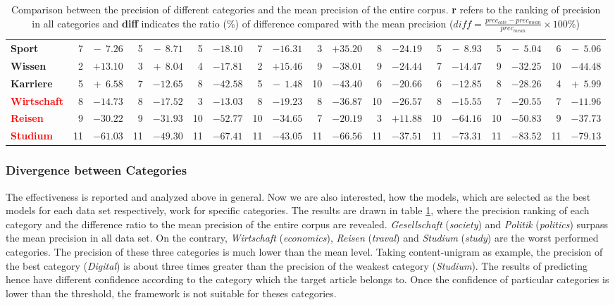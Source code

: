 \begin{table}[!htb]
{\begin{tabular}{lrr|rr|rr|rr|rr|rr|rr|rr|rr}
\textbf{Sport} & 7 & $-~~7.26$ & 5 & $-~~8.71$ & 5 & $-18.10$ & 7 & $-16.31$ & 3 & $+35.20$ & 8 & $-24.19$ & 5 & $-~~8.93$ & 5 & $-~~5.04$ & 6 & $-~~5.06$ \\
\textbf{Wissen} & 2 & $+13.10$ & 3 & $+~~8.04$ & 4 & $-17.81$ & 2 & $+15.46$ & 9 & $-38.01$ & 9 & $-24.44$ & 7 & $-14.47$ & 9 & $-32.25$ & 10 & $-44.48$ \\
\textbf{Karriere} & 5 & $+~~6.58$ & 7 & $-12.65$ & 8 & $-42.58$ & 5 & $-~~1.48$ & 10 & $-43.40$ & 6 & $-20.66$ & 6 & $-12.85$ & 8 & $-28.26$ & 4 & $+~~5.99$ \\
\textbf{\textcolor{red}{Wirtschaft}} & 8 & $-14.73$ & 8 & $-17.52$ & 3 & $-13.03$ & 8 & $-19.23$ & 8 & $-36.87$ & 10 & $-26.57$ & 8 & $-15.55$ & 7 & $-20.55$ & 7 & $-11.96$ \\
\textbf{\textcolor{red}{Reisen}} & 9 & $-30.22$ & 9 & $-31.93$ & 10 & $-52.77$ & 10 & $-34.65$ & 7 & $-20.19$ & 3 & $+11.88$ & 10 & $-64.16$ & 10 & $-50.83$ & 9 & $-37.73$ \\
\textbf{\textcolor{red}{Studium}} & 11 & $-61.03$ & 11 & $-49.30$ & 11 & $-67.41$ & 11 & $-43.05$ & 11 & $-66.56$ & 11 & $-37.51$ & 11 & $-73.31$ & 11 & $-83.52$ & 11 & $-79.13$ \\ \hline
\end{tabular}%
}
\caption{Comparison between the precision of different categories and the mean precision of the entire corpus. \textbf{r} refers to the ranking of precision in all categories and \textbf{diff} indicates the ratio (\%) of difference compared with the mean precision ($diff = \frac{prec_{cate} - prec_{mean}}{prec_{mean}}\times 100\%$)}
\label{tab:cate_precision}
\end{table}

\subsubsection{Divergence between Categories}

The effectiveness is reported and analyzed above in general. Now we are also interested, how the models, which are selected as the best models for each data set respectively, work for specific categories. The results are drawn in table \ref{tab:cate_precision}, where the precision ranking of each category and the difference ratio to the mean precision of the entire corpus are revealed. \textit{Gesellschaft} (\textit{society}) and \textit{Politik} (\textit{politics}) surpass the mean precision in all data set. On the contrary, \textit{Wirtschaft} (\textit{economics}), \textit{Reisen} (\textit{traval}) and \textit{Studium} (\textit{study}) are the worst performed categories. The precision of these three categories is much lower than the mean level. Taking content-unigram as example, the precision of the best category (\textit{Digital}) is about three times greater than the precision of the weakest category (\textit{Studium}). The results of predicting hence have  different confidence according to the category which the target article belongs to. Once the confidence of particular categories is lower than the threshold, the framework is not suitable for theses categories. 

